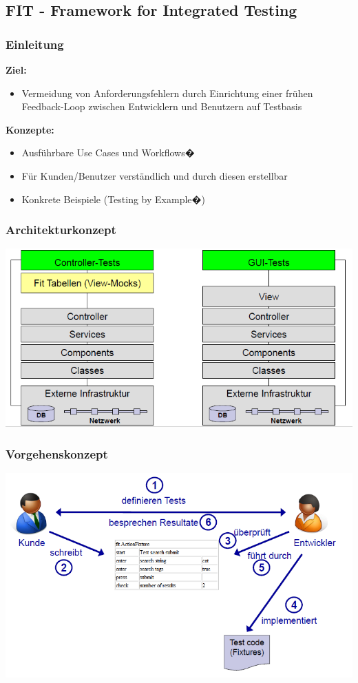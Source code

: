 \documentclass[a4paper,10pt]{article}
\newcommand{\Bold}[1]{\textbf{#1}} %
\begin{document}
\subsection{FIT - Framework for Integrated Testing}
\subsubsection{Einleitung}
\Bold {Ziel:}
\begin{itemize}
\item Vermeidung von Anforderungsfehlern durch Einrichtung einer fr\"uhen Feedback-Loop zwischen Entwicklern und Benutzern auf Testbasis
\end{itemize}
\Bold {Konzepte:}
\begin{itemize}
\item Ausf\"uhrbare Use Cases und Workflows�
\item F\"ur Kunden/Benutzer verst\"andlich und durch diesen erstellbar
\item Konkrete Beispiele (Testing by Example�)
\end{itemize}

\subsubsection{Architekturkonzept}
\includegraphics[scale=0.5]{FIT_Architekturkonzept.png}

\subsubsection{Vorgehenskonzept}
\includegraphics[scale=0.5]{FIT_Vorgehenskonzept.png}
\end{document}
